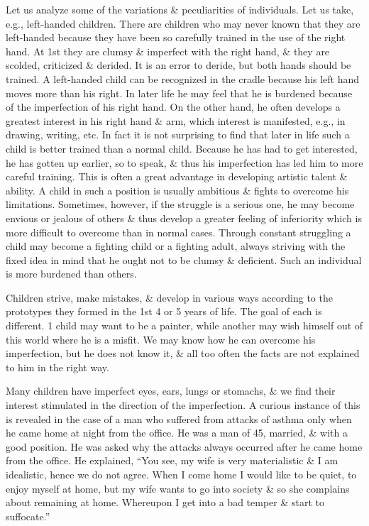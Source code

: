\documentclass{article}
\numberwithin{equation}{section}
\begin{document}
Let us analyze some of the variations \& peculiarities of individuals. Let us take, e.g., left-handed children. There are children who may never known that they are left-handed because they have been so carefully trained in the use of the right hand. At 1st they are clumsy \& imperfect with the right hand, \& they are scolded, criticized \& derided. It is an error to deride, but both hands should be trained. A left-handed child can be recognized in the cradle because his left hand moves more than his right. In later life he may feel that he is burdened because of the imperfection of his right hand. On the other hand, he often develops a greatest interest in his right hand \& arm, which interest is manifested, e.g., in drawing, writing, etc. In fact it is not surprising to find that later in life such a child is better trained than a normal child. Because he has had to get interested, he has gotten up earlier, so to speak, \& thus his imperfection has led him to more careful training. This is often a great advantage in developing artistic talent \& ability. A child in such a position is usually ambitious \& fights to overcome his limitations. Sometimes, however, if the struggle is a serious one, he may become envious or jealous of others \& thus develop a greater feeling of inferiority which is more difficult to overcome than in normal cases. Through constant struggling a child may become a fighting child or a fighting adult, always striving with the fixed idea in mind that he ought not to be clumsy \& deficient. Such an individual is more burdened than others.

Children strive, make mistakes, \& develop in various ways according to the prototypes they formed in the 1st 4 or 5 years of life. The goal of each is different. 1 child may want to be a painter, while another may wish himself out of this world where he is a misfit. We may know how he can overcome his imperfection, but he does not know it, \& all too often the facts are not explained to him in the right way.

Many children have imperfect eyes, ears, lungs or stomachs, \& we find their interest stimulated in the direction of the imperfection. A curious instance of this is revealed in the case of a man who suffered from attacks of asthma only when he came home at night from the office. He was a man of 45, married, \& with a good position. He was asked why the attacks always occurred after he came home from the office. He explained, ``You see, my wife is very materialistic \& I am idealistic, hence we do not agree. When I come home I would like to be quiet, to enjoy myself at home, but my wife wants to go into society \& so she complains about remaining at home. Whereupon I get into a bad temper \& start to suffocate.''
\end{document}
